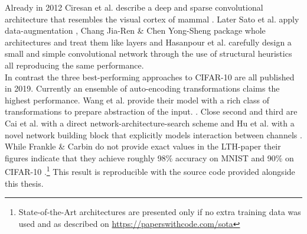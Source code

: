 Already in 2012 Ciresan et al. describe a deep and sparse convolutional architecture that resembles the visual cortex of mammal \cite{Multi-Column}. Later Sato et al. apply data-augmentation \cite{APAC}, Chang Jia-Ren \& Chen Yong-Sheng package whole architectures and treat them like layers \cite{Batch-Normalized} and Hasanpour et al. carefully design a small and simple convolutional network through the use of structural heuristics \cite{Keep-It-Simple} all reproducing the same performance.\\
In contrast the three best-performing approaches to CIFAR-10 are all published in 2019. Currently an ensemble of auto-encoding transformations claims the highest performance. Wang et al. provide their model with a rich class of transformations to prepare abstraction of the input. \cite{EnAET}. Close second and third are Cai et al. with a direct network-architecture-search scheme \cite{Direct-NAS} and Hu et al. with a novel network building block that explicitly models interaction between channels \cite{Squee}. \\ 
While Frankle \& Carbin do not provide exact values in the LTH-paper their figures indicate that they achieve roughly 98\% accuracy on MNIST and 90\% on CIFAR-10 \cite{LTH}.\footnote
{State-of-the-Art architectures are presented only if no extra training data was used and as described on \href{https://paperswithcode.com/sota}{https://paperswithcode.com/sota}} This result is reproducible with the source code provided alongside this thesis.


